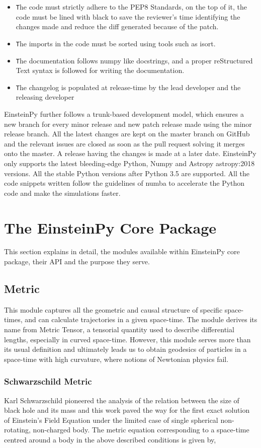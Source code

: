 \documentclass[onecolumn]{aa}
\begin{document}
\begin{itemize}
\item \texttt The code must strictly adhere to the PEP8 Standards, on the top of it, the code must be lined with black to save the reviewer’s time identifying the changes made and reduce the diff generated because of the patch.
\item \texttt The imports in the code must be sorted using tools such as isort. 
\item \texttt The documentation follows numpy like docstrings, and a proper reStructured Text syntax is followed for writing the documentation.
\item \texttt The changelog is populated at release-time by the lead developer and the releasing developer
\end{itemize}
EinsteinPy further follows a trunk-based development model, which ensures a new branch for every minor release and new patch release made using the minor release branch. All the latest changes are kept on the master branch on GitHub and the relevant issues are closed as soon as the pull request solving it merges onto the master. A release having the changes is made at a later date. 
EinsteinPy only supports the latest bleeding-edge Python, Numpy\citep{numpy} and Astropy \citep{2019arXiv190710121V}{astropy:2018} versions.  All the stable Python versions after Python 3.5 are supported. All the code snippets written follow the guidelines of numba \citep{Lam2015NumbaAL} to accelerate the Python code and make the simulations faster. 

\section{The EinsteinPy Core Package} 
This section explains in detail, the modules available within EinsteinPy core package, their API and the purpose they serve.
\subsection{Metric}
This module captures all the geometric and causal structure of specific space-times, and can calculate trajectories in a given space-time. 
The module derives its name from Metric Tensor, a tensorial quantity used to describe differential lengths, especially in curved space-time. 
However, this module serves more than its usual definition and ultimately leads us to obtain geodesics of particles in a space-time with high curvature, where notions of Newtonian physics fail.
\subsubsection{Schwarzschild Metric} 
Karl Schwarzschild pioneered the analysis of the relation between the size of black hole and its mass and this work paved the way for the first exact solution of Einstein's Field Equation under the limited case of single spherical non-rotating, non-charged body. 
The metric equation \citep{Schwarzschild:1916uq} corresponding to a space-time centred around a body in the above described conditions is given by,
\end{document}
